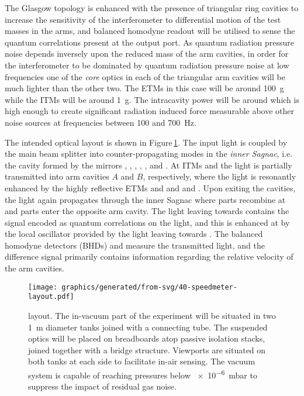 The Glasgow \SSMEXPT{} topology is enhanced with the presence of triangular ring cavities to increase the sensitivity of the interferometer to differential motion of the test masses in the arms, and balanced homodyne readout will be utilised to sense the quantum correlations present at the output port. As quantum radiation pressure noise depends inversely upon the reduced mass of the arm cavities, in order for the interferometer to be dominated by quantum radiation pressure noise at low frequencies one of the \emph{core} optics in each of the triangular arm cavities will be much lighter than the other two. The \glspl{ETM} in this case will be around \SI{100}{\gram} while the \glspl{ITM} will be around \SI{1}{\gram}. The intracavity power will be around  which is high enough to create significant radiation induced force measurable above other noise sources at frequencies between \num{100} and \SI{700}{\hertz}.

The intended optical layout is shown in Figure\,\ref{fig:ssm-layout}. The input light is coupled by the main beam splitter \MSIX{} into counter-propagating modes in the \emph{inner Sagnac}, i.e. the cavity formed by the mirrors \MSIX{}, \MSEVEN{}, \MONEA{}, \MTEN{}, \MNINE{}, \MEIGHT{} and \MONEB{}. At \glspl{ITM} \MONEA{} and \MONEB{} the light is partially transmitted into arm cavities $A$ and $B$, respectively, where the light is resonantly enhanced by the highly reflective \glspl{ETM} \MTWOA{} and \MTHREEA{} and \MTWOB{} and \MTHREEB{}. Upon exiting the cavities, the light again propagates through the inner Sagnac where parts recombine at \MSIX{} and parts enter the opposite arm cavity. The light leaving \MSIX{} towards \MFOURTEEN{} contains the signal encoded as quantum correlations on the light, and this is enhanced at \MSIXTEEN{} by the local oscillator provided by the light leaving \MSIX{} towards \MTWELVE{}. The balanced homodyne detectors (\glspl{BHD}) \HDA{} and \HDB{} measure the transmitted light, and the difference signal primarily contains information regarding the relative velocity of the arm cavities.

\begin{figure}
  \centering
  \texttt{[image: graphics/generated/from-svg/40-speedmeter-layout.pdf]}
  \caption[\SSMEXPT{} layout]{\label{fig:ssm-layout}\SSMEXPT{} layout. The in-vacuum part of the experiment will be situated in two \SI{1}{\meter} diameter tanks joined with a connecting tube. The suspended optics will be placed on breadboards atop passive isolation stacks, joined together with a bridge structure. Viewports are situated on both tanks at each side to facilitate in-air sensing. The vacuum system is capable of reaching pressures below \SI{e-6}{\milli\bar} to suppress the impact of residual gas noise.}
\end{figure}

